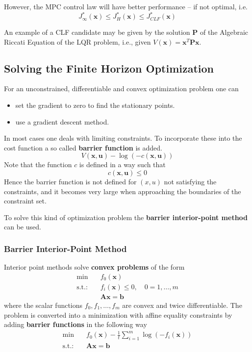 However, the MPC control law will have better performance -- if not optimal, i.e. %
\begin{equation*}
    J^*_\infty(\mathbf{x}) \leq J^*_H(\mathbf{x}) \leq J^*_{CLF}(\mathbf{x})
\end{equation*}

An example of a CLF candidate may be given by the solution $\mathbf{P}$ of the Algebraic Riccati Equation of the LQR problem, i.e., given $V(\mathbf{x}) = \mathbf{x}^T \mathbf{Px}$.

\subsection{Solving the Finite Horizon Optimization}

For an unconstrained, differentiable and convex optimization problem one can
\begin{itemize}
    \item set the gradient to zero to find the stationary points.
    \item use a gradient descent method.
\end{itemize}

In most cases one deals with limiting constraints. To incorporate these into the cost function a so called \textbf{barrier function} is added.
\begin{equation*}
    V(\mathbf{x,u}) - \log(-c(\mathbf{x,u}))
\end{equation*}
Note that the function $c$ is defined in a way such that
\begin{equation*}
    c(\mathbf{x,u}) \leq 0
\end{equation*}
Hence the barrier function is not defined for $(x,u)$ not satisfying the constraints, and it becomes very large when approaching the boundaries of the constraint set.

To solve this kind of optimization problem the \textbf{barrier interior-point method} can be used.

\subsubsection{Barrier Interior-Point Method}
Interior point methods solve \textbf{convex problems} of the form
\begin{align*}
    \min \quad         & f_0( \mathbf{x})                                 \\
    \text{s.t.:} \quad & f_i( \mathbf{x}) \leq 0 , \quad 0 = 1, \ldots, m \\
                       & \mathbf{Ax} = \mathbf{b}
\end{align*}
where the scalar functions $f_0,f_1,\ldots,f_m$ are convex and twice differentiable.
\newpar{}
The problem is converted into a minimization with affine equality constraints by adding \textbf{barrier functions} in the following way
\begin{align*}
    \min \quad        & f_0(\mathbf{x}) - \frac{1}{t}\sum_{i=1}^{m}\log(-f_i(\mathbf{x})) \\
    \text{s.t.:}\quad & \mathbf{Ax}=\mathbf{b}
\end{align*}

